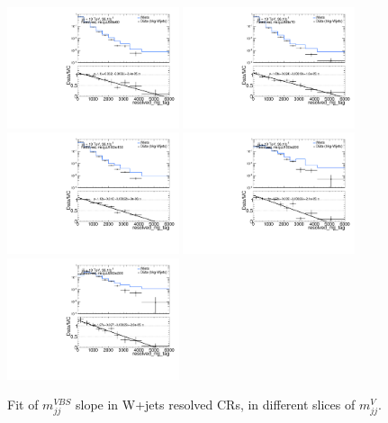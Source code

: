 \begin{figure}[ht]
	\centering
	\includegraphics[width=0.45\textwidth]{Chapter5/2para_msigJJ50to60.pdf}
	\includegraphics[width=0.45\textwidth]{Chapter5/2para_msigJJ60to70.pdf}
	\includegraphics[width=0.45\textwidth]{Chapter5/2para_msigJJ100to150.pdf}
	\includegraphics[width=0.45\textwidth]{Chapter5/2para_msigJJ150to200.pdf}
	\includegraphics[width=0.45\textwidth]{Chapter5/2para_msigJJ200to300.pdf}
	\caption{\label{Fig:mjj_dataMC_fit_resolved} Fit of $m^{VBS}_{jj}$ slope in W+jets resolved CRs, in different slices of $m^{V}_{jj}$. }
\end{figure}


